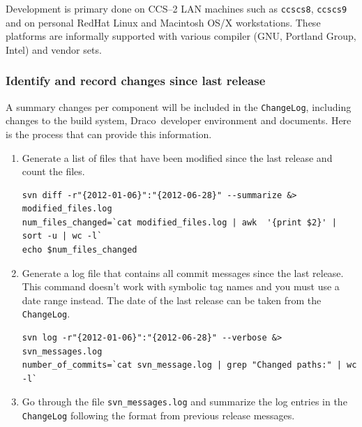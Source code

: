 \documentclass[note]{newmemo}
\newcommand{\draco}{{\normalfont\small\sffamily Draco}}
\newcommand{\cvs}{\textsf{CVS}}
\begin{document}
Development is primary done on CCS--2 LAN machines such as
\texttt{ccscs8}, \texttt{ccscs9} and on personal RedHat Linux and
Macintosh OS/X workstations.  These platforms are informally supported
with various compiler (GNU, Portland Group, Intel) and vendor sets.  


\subsubsection{Identify and record changes since last release}
\label{sec:changes_since_lr}

A summary changes per component will be included in the
\texttt{ChangeLog}, including changes to the build system,
\draco\ developer environment and documents.
Here is the process that can provide this information.

\begin{enumerate}
\item Generate a list of files that have been modified since the last release and count the files.
\begin{lstlisting}[basicstyle=\footnotesize, xleftmargin=.5in, 
  xrightmargin=0.5in]
svn diff -r"{2012-01-06}":"{2012-06-28}" --summarize &> modified_files.log
num_files_changed=`cat modified_files.log | awk  '{print $2}' | sort -u | wc -l`
echo $num_files_changed
\end{lstlisting}
\item Generate a log file that contains all commit messages since the last
  release.  This command doesn't work with symbolic tag names and you
  must use a date range instead.  The date of the last release can be
  taken from the \texttt{ChangeLog}.
\begin{lstlisting}[basicstyle=\footnotesize, xleftmargin=0.5in, 
  xrightmargin=0.5in]
svn log -r"{2012-01-06}":"{2012-06-28}" --verbose &> svn_messages.log  
number_of_commits=`cat svn_message.log | grep "Changed paths:" | wc -l`
\end{lstlisting}
\item Go through the file \texttt{svn\_messages.log}
  and summarize the log entries in the \texttt{ChangeLog} following the format from previous release messages.
\end{enumerate}
\end{document}
